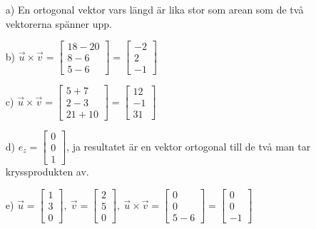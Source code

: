 \begin{itemize}
	\item[a) ] En ortogonal vektor vars längd är lika stor som arean som de två vektorerna spänner upp.
	\item[b) ] $\vec{u}\times \vec{v}=\begin{bmatrix}18-20\\8-6\\5-6\end{bmatrix}=\begin{bmatrix}-2\\2\\-1\end{bmatrix}$
	\item[c) ] $\vec{u}\times \vec{v}=\begin{bmatrix}5+7\\2-3\\21+10\end{bmatrix}=\begin{bmatrix}12\\-1\\31\end{bmatrix}$
	\item[d) ] $e_z=\begin{bmatrix}0\\0\\1\end{bmatrix}$, ja resultatet är en vektor ortogonal till de två man tar kryssprodukten av.
	\item[e) ] $\vec{u}=\begin{bmatrix}1\\3\\0\end{bmatrix},\ \vec{v}=\begin{bmatrix}2\\5\\0\end{bmatrix},\ 
	\vec{u}\times \vec{v}=\begin{bmatrix}0\\0\\5-6\end{bmatrix}=\begin{bmatrix}0\\0\\-1\end{bmatrix}$
\end{itemize}
